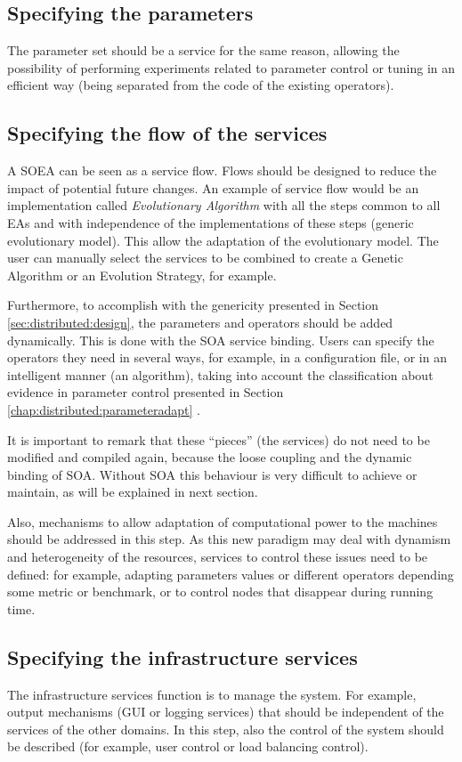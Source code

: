 \subsection{Specifying the parameters}
The parameter set should be a service for the same reason, allowing the possibility of performing
experiments related to  parameter control or tuning \cite{ParameterControlEiben07} in an efficient way
(being separated from the code of the existing operators). 

\subsection{Specifying the flow of the services}
\label{subsec:soaea:flows}
A SOEA can be seen as a service flow. Flows should be designed to reduce the impact of potential future changes. An example of service flow would be an implementation called {\em Evolutionary Algorithm} with all the steps common to all EAs and with independence of the implementations of these steps (generic evolutionary model). This allow the adaptation of the evolutionary model. The user can manually
  select the services to be combined to create a Genetic Algorithm or
  an Evolution Strategy, for example.  


  Furthermore, to accomplish with the genericity presented in Section \ref{sec:distributed:design}, the parameters and operators should be added dynamically. This is done with the SOA service binding. Users can specify the operators they need in several ways, for example, in a configuration file, or in an intelligent manner (an algorithm), taking into account the classification about evidence in parameter control presented in Section \ref{chap:distributed:parameteradapt} . 

  It is important to remark that these ``pieces'' (the services) do not need to be modified and compiled again, because the loose coupling and the dynamic binding of SOA. Without SOA this behaviour is very difficult to achieve or maintain, as will be explained in next section.

  Also, mechanisms to allow adaptation of computational power to the machines should be addressed in this step. As this new paradigm may deal with dynamism and heterogeneity of the resources, services to control these issues need to be defined: for example, adapting parameters values or different operators depending some metric or benchmark, or to control nodes that disappear during running time. 

\subsection{Specifying the infrastructure services}
The infrastructure services function is to manage the system. For example, output mechanisms (GUI or logging services) that should be independent of the services of the other domains. In this step, also the control of the system should be described (for example, user control or load balancing control).





